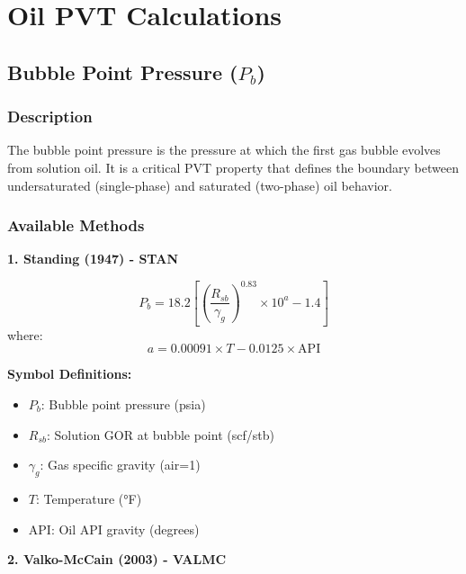 \documentclass[11pt,a4paper]{article}
\newcommand{\symitem}[2]{\item \textbf{#1}: #2}
\begin{document}
\newpage

\section{Oil PVT Calculations}

\subsection{Bubble Point Pressure ($P_b$)}

\subsubsection{Description}
The bubble point pressure is the pressure at which the first gas bubble evolves from solution oil. It is a critical PVT property that defines the boundary between undersaturated (single-phase) and saturated (two-phase) oil behavior.

\subsubsection{Available Methods}

\textbf{1. Standing (1947) - STAN}

\begin{tcolorbox}[colback=formulabox,colframe=black!75]
\begin{equation}
P_b = 18.2 \left[ \left( \frac{R_{sb}}{\gamma_g} \right)^{0.83} \times 10^{a} - 1.4 \right]
\end{equation}
where:
\begin{equation}
a = 0.00091 \times T - 0.0125 \times \text{API}
\end{equation}
\end{tcolorbox}

\textbf{Symbol Definitions:}
\begin{itemize}[leftmargin=2cm]
\symitem{$P_b$}{Bubble point pressure (psia)}
\symitem{$R_{sb}$}{Solution GOR at bubble point (scf/stb)}
\symitem{$\gamma_g$}{Gas specific gravity (air=1)}
\symitem{$T$}{Temperature (°F)}
\symitem{$\text{API}$}{Oil API gravity (degrees)}
\end{itemize}

\textbf{2. Valko-McCain (2003) - VALMC}
\end{document}
